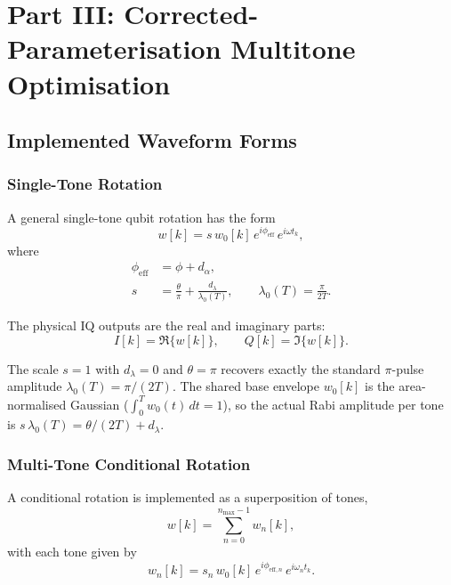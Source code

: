 \documentclass[11pt]{article}
\begin{document}
\section{Part III: Corrected-Parameterisation Multitone Optimisation}

\subsection{Implemented Waveform Forms}

\subsubsection{Single-Tone Rotation}

A general single-tone qubit rotation has the form
\begin{equation}
w[k]
=
s\,w_0[k]\,
e^{i\phi_{\mathrm{eff}}}\,
e^{i\omega t_k},
\end{equation}
where
\begin{align}
\phi_{\mathrm{eff}} &= \phi + d_\alpha, \\
s &= \frac{\theta}{\pi} + \frac{d_\lambda}{\lambda_0(T)},
\qquad
\lambda_0(T) = \frac{\pi}{2T}.
\end{align}

The physical IQ outputs are the real and imaginary parts:
\begin{equation}
I[k] = \Re\{w[k]\},
\qquad
Q[k] = \Im\{w[k]\}.
\end{equation}

The scale $s=1$ with $d_\lambda=0$ and $\theta=\pi$ recovers exactly the
standard $\pi$-pulse amplitude $\lambda_0(T)=\pi/(2T)$. The shared base
envelope $w_0[k]$ is the area-normalised Gaussian
($\int_0^T w_0(t)\,dt = 1$), so the actual Rabi amplitude per tone is
$s\,\lambda_0(T) = \theta/(2T) + d_\lambda$.

\subsubsection{Multi-Tone Conditional Rotation}

A conditional rotation is implemented as a superposition of tones,
\begin{equation}
w[k] = \sum_{n=0}^{n_{\max}-1} w_n[k],
\end{equation}
with each tone given by
\begin{equation}
w_n[k]
=
s_n\,w_0[k]\,
e^{i\phi_{\mathrm{eff},n}}\,
e^{i\omega_n t_k}.
\end{equation}
\end{document}

